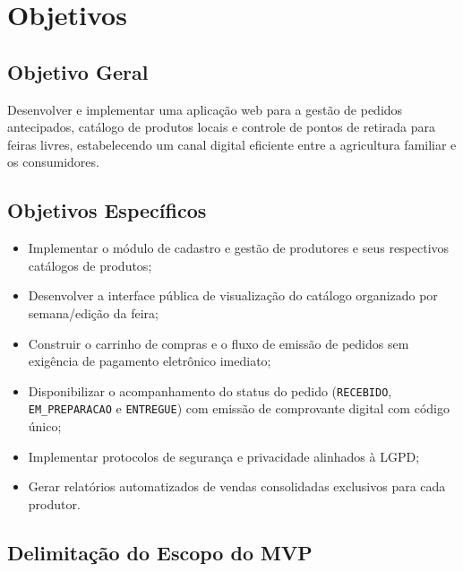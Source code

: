 \documentclass[12pt,a4paper]{article}
\begin{document}
\section{Objetivos}

\subsection{Objetivo Geral}

Desenvolver e implementar uma aplicação web para a gestão de pedidos antecipados, catálogo de produtos locais e controle de pontos de retirada para feiras livres, estabelecendo um canal digital eficiente entre a agricultura familiar e os consumidores.

\subsection{Objetivos Específicos}

\begin{itemize}[leftmargin=1.5cm]

    \item Implementar o módulo de cadastro e gestão de produtores e seus respectivos catálogos de produtos;

    \item Desenvolver a interface pública de visualização do catálogo organizado por semana/edição da feira;

    \item Construir o carrinho de compras e o fluxo de emissão de pedidos sem exigência de pagamento eletrônico imediato;

    \item Disponibilizar o acompanhamento do status do pedido (\texttt{RECEBIDO}, \texttt{EM\_PREPARACAO} e \texttt{ENTREGUE}) com emissão de comprovante digital com código único;

    \item Implementar protocolos de segurança e privacidade alinhados à LGPD;

    \item Gerar relatórios automatizados de vendas consolidadas exclusivos para cada produtor.

\end{itemize}

\subsection{Delimitação do Escopo do MVP}
\end{document}
